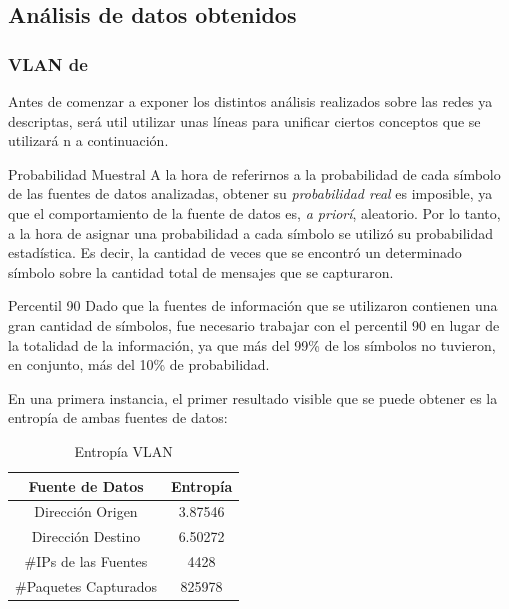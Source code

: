     \subsection{An\'alisis de datos obtenidos}
    \subsubsection{VLAN de~}
    \par Antes de comenzar a exponer los distintos an\'alisis realizados sobre las redes
    ya descriptas, ser\'a util utilizar unas l\'ineas para unificar ciertos conceptos que
    se utilizar\'a n a continuaci\'on.

    \begin{LaTeXdescription}
        \item[Probabilidad Muestral] A la hora de referirnos a la probabilidad de cada
        s\'imbolo de las fuentes de datos analizadas, obtener su \textit{probabilidad
        real} es imposible, ya que el comportamiento de la fuente de datos es, \textit{%
        a prior\'i}, aleatorio. Por lo tanto, a la hora de asignar una probabilidad a cada
        s\'imbolo se utiliz\'o su probabilidad estad\'istica. Es decir, la cantidad de
        veces que se encontr\'o un determinado s\'imbolo sobre la cantidad total de mensajes
        que se capturaron.\\
        
        \item[Percentil 90] Dado que la fuentes de informaci\'on que se utilizaron contienen
        una gran cantidad de s\'imbolos, fue necesario trabajar con el percentil 90 en lugar
        de la totalidad de la informaci\'on, ya que m\'as del 99\% de los s\'imbolos no
        tuvieron, en conjunto, m\'as del 10\% de probabilidad.\\
        
    \end{LaTeXdescription}

    \par En una primera instancia, el primer resultado visible que se puede obtener es la
    entrop\'ia de ambas fuentes de datos:

    \begin{table}[!h]
    \centering
      \begin{tabular}{c c}
        Fuente de Datos & Entrop\'ia \\
        \hline\hline
        Direcci\'on Origen & 3.87546 \\
        Direcci\'on Destino & 6.50272 \\
        \hline\hline
        \#IPs de las Fuentes & 4428\\
        \#Paquetes Capturados & 825978\\
        \hline
        \end{tabular}
      \bigskip
      \caption{Entrop\'ia VLAN }
    \end{table}

